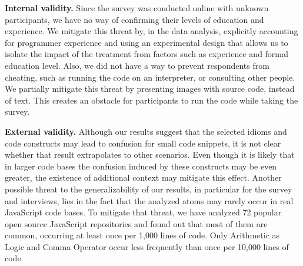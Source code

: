 


\textbf{Internal validity.} Since the survey was conducted online with unknown participants, we have no way of confirming their levels of education and experience. We mitigate this threat by, in the data analysis, explicitly accounting for programmer experience and using an experimental design that allows us to isolate the impact of the treatment from factors such as experience and formal education level. Also, we did not have a way to prevent respondents from cheating, such as running the code on an interpreter, or consulting other people. We partially mitigate this threat by presenting images with source code, instead of text. This creates an obstacle for participants to run the code while taking the survey.


\textbf{External validity.} Although our results suggest that the selected idioms and code constructs may lead to confusion for small code snippets, it is not clear whether that result extrapolates to other scenarios. Even though it is likely that in larger code bases the confusion induced by these constructs may be even greater, the existence of additional context may mitigate this effect. Another possible threat to the generalizability of our results, in particular for the survey and interviews, lies in the fact that the analyzed atoms may rarely occur in real JavaScript code bases. To mitigate that threat, we have analyzed 72 popular open source JavaScript repositories and found out that most of them are common, occurring at least once per 1,000 lines of code. Only Arithmetic as Logic and Comma Operator occur less frequently than once per 10,000 lines of code. 


